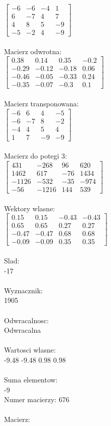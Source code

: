\documentclass[a4paper,12pt]{article}
\begin{document}
$\begin{bmatrix} -6&-6&-4&1\\6&-7&4&7\\4&8&5&-9\\-5&-2&4&-9 \end{bmatrix}$
\\
\\
Macierz odwrotna:\\

$\begin{bmatrix} 0.38&0.14&0.35&-0.2\\-0.29&-0.12&-0.18&0.06\\-0.46&-0.05&-0.33&0.24\\-0.35&-0.07&-0.3&0.1 \end{bmatrix}$
\\
\\
Macierz transponowana:\\

$\begin{bmatrix} -6&6&4&-5\\-6&-7&8&-2\\-4&4&5&4\\1&7&-9&-9 \end{bmatrix}$
\\
\\
Macierz do potegi 3:\\

$\begin{bmatrix} 431&-268&96&620\\1462&617&-76&1434\\-1126&-532&-35&-974\\-56&-1216&144&539 \end{bmatrix}$
\\
\\
Wektory wlasne:\\

$\begin{bmatrix} 0.15&0.15&-0.43&-0.43\\0.65&0.65&0.27&0.27\\-0.47&-0.47&0.68&0.68\\-0.09&-0.09&0.35&0.35 \end{bmatrix}$
\\
\\
Slad:\\
-17
\\
\\
Wyznacznik:\\
1905
\\
\\
Odwracalnosc:\\
Odwracalna
\\
\\
Wartosci wlasne:\\
-9.48 -9.48 0.98 0.98
\\
\\
Suma elementow:\\
-9
\\
\newpage
Numer macierzy:
676
\\
\\
Macierz:\\
\end{document}
